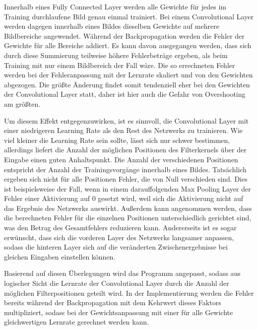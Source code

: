 \documentclass[../main.tex]{subfiles}
\begin{document}
Innerhalb eines Fully Connected Layer werden alle Gewichte für jedes im Training durchlaufene Bild genau einmal trainiert. Bei einem Convolutional Layer werden dagegen innerhalb eines Bildes dieselben Gewichte auf mehrere Bildbereiche angewendet. Während der Backpropagation werden die Fehler der Gewichte für alle Bereiche addiert. Es kann davon ausgegangen werden, dass sich durch diese Summierung teilweise höhere Fehlerbeträge ergeben, als beim Training mit nur einem Bildbereich der Fall wäre. Die so errechneten Fehler werden bei der Fehleranpassung mit der Lernrate skaliert und von den Gewichten abgezogen. Die größte Änderung findet somit tendenziell eher bei den Gewichten der Convolutional Layer statt, daher ist hier auch die Gefahr von Overshooting am größten. 

Um diesem Effekt entgegenzuwirken, ist es sinnvoll, die Convolutional Layer mit einer niedrigeren Learning Rate als den Rest des Netzwerks zu trainieren. Wie viel kleiner die Learning Rate sein sollte, lässt sich nur schwer bestimmen, allerdings liefert die Anzahl der möglichen Positionen des Filterkernels über der Eingabe einen guten Anhaltspunkt. Die Anzahl der verschiedenen Positionen entspricht der Anzahl der Trainingsvorgänge innerhalb eines Bildes. Tatsächlich ergeben sich nicht für alle Positionen Fehler, die von Null verschieden sind. Dies ist beispielsweise der Fall, wenn in einem darauffolgenden Max Pooling Layer der Fehler einer Aktivierung auf 0 gesetzt wird, weil sich die Aktivierung nicht auf das Ergebnis des Netzwerks auswirkt. Außerdem kann angenommen werden, dass die berechneten Fehler für die einzelnen Positionen unterschiedlich gerichtet sind, was den Betrag des Gesamtfehlers reduzieren kann. Andererseits ist es sogar erwünscht, dass sich die vorderen Layer des Netzwerks langsamer anpassen, sodass die hinteren Layer sich auf die veränderten Zwischenergebnisse bei gleichen Eingaben einstellen können. 

Basierend auf diesen Überlegungen wird das Programm angepasst, sodass aus logischer Sicht die Lernrate der Convolutional Layer durch die Anzahl der möglichen Filterpositionen geteilt wird. In der Implementierung werden die Fehler bereits während der Backpropagation mit dem Kehrwert dieses Faktors multipliziert, sodass bei der Gewichtsanpassung mit einer für alle Gewichte gleichwertigen Lernrate gerechnet werden kann. 
\end{document}
